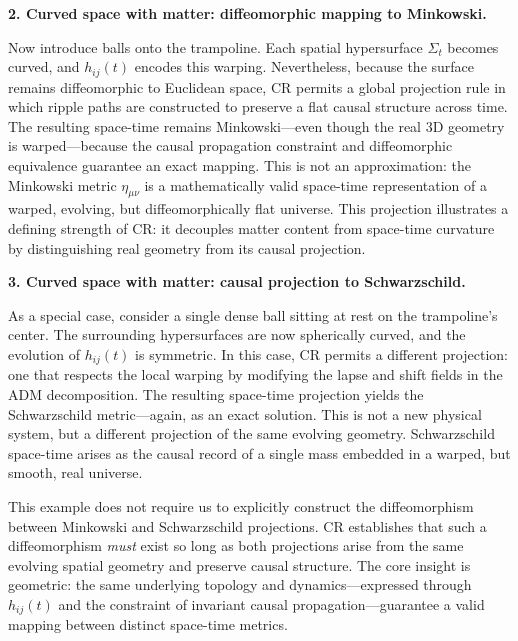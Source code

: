 \documentclass[12pt]{book}
\begin{document}
\vspace{4pt}
\noindent\textbf{2. Curved space with matter: diffeomorphic mapping to Minkowski.}

Now introduce balls onto the trampoline. Each spatial hypersurface $\Sigma_t$ becomes curved, and $h_{ij}(t)$ encodes this warping. Nevertheless, because the surface remains diffeomorphic to Euclidean space, CR permits a global projection rule in which ripple paths are constructed to preserve a flat causal structure across time. The resulting space-time remains Minkowski---even though the real 3D geometry is warped---because the causal propagation constraint and diffeomorphic equivalence guarantee an exact mapping. This is not an approximation: the Minkowski metric $\eta_{\mu\nu}$ is a mathematically valid space-time representation of a warped, evolving, but diffeomorphically flat universe. This projection illustrates a defining strength of CR: it decouples matter content from space-time curvature by distinguishing real geometry from its causal projection.

\vspace{4pt}
\noindent\textbf{3. Curved space with matter: causal projection to Schwarzschild.}

As a special case, consider a single dense ball sitting at rest on the trampoline's center. The surrounding hypersurfaces are now spherically curved, and the evolution of $h_{ij}(t)$ is symmetric. In this case, CR permits a different projection: one that respects the local warping by modifying the lapse and shift fields in the ADM decomposition. The resulting space-time projection yields the Schwarzschild metric---again, as an exact solution. This is not a new physical system, but a different projection of the same evolving geometry. Schwarzschild space-time arises as the causal record of a single mass embedded in a warped, but smooth, real universe.

\vspace{4pt}

This example does not require us to explicitly construct the diffeomorphism between Minkowski and Schwarzschild projections. CR establishes that such a diffeomorphism \textit{must} exist so long as both projections arise from the same evolving spatial geometry and preserve causal structure. The core insight is geometric: the same underlying topology and dynamics---expressed through $h_{ij}(t)$ and the constraint of invariant causal propagation---guarantee a valid mapping between distinct space-time metrics.
\end{document}

